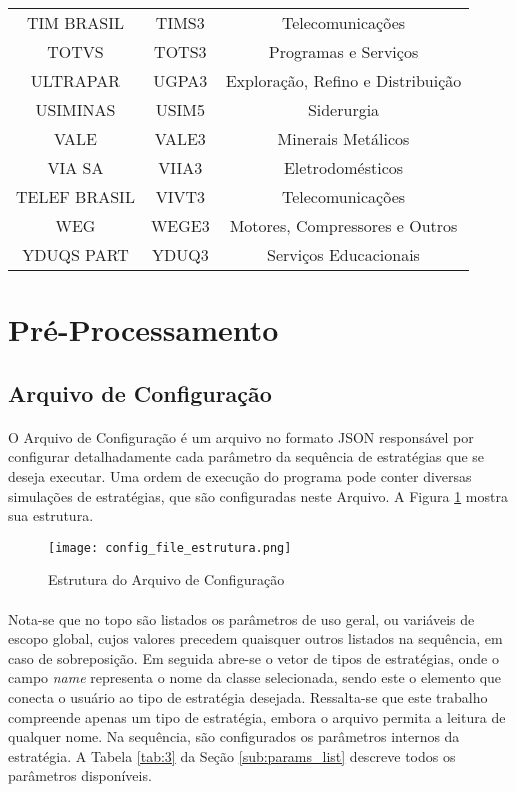 {\begin{longtable}[c]{ccc}
    TIM BRASIL & TIMS3 & Telecomunicações \\
    TOTVS & TOTS3 & Programas e Serviços \\
    ULTRAPAR & UGPA3 & Exploração, Refino e Distribuição \\
    USIMINAS & USIM5 & Siderurgia \\
    VALE & VALE3 & Minerais Metálicos \\
    VIA SA & VIIA3 & Eletrodomésticos \\
    TELEF BRASIL & VIVT3 & Telecomunicações \\
    WEG & WEGE3 & Motores, Compressores e Outros \\
    YDUQS PART & YDUQ3 & Serviços Educacionais \\


\end{longtable}}



\FloatBarrier
\section{Pré-Processamento}

\FloatBarrier
\subsection{Arquivo de Configuração}
\label{sub:conf_file}

\paragraph{} O Arquivo de Configuração é um arquivo no formato JSON responsável por configurar detalhadamente cada parâmetro da sequência de estratégias que se deseja executar. Uma ordem de execução do programa pode conter diversas simulações de estratégias, que são configuradas neste Arquivo. A Figura \ref{fig:101} mostra sua estrutura.

\begin{figure}[!htb]
    \texttt{[image: config\_file\_estrutura.png]}
    \centering
    \caption{Estrutura do Arquivo de Configuração}
    \label{fig:101}
\end{figure}

\paragraph{} Nota-se que no topo são listados os parâmetros de uso geral, ou variáveis de escopo global, cujos valores precedem quaisquer outros listados na sequência, em caso de sobreposição. Em seguida abre-se o vetor de tipos de estratégias, onde o campo \textit{name} representa o nome da classe selecionada, sendo este o elemento que conecta o usuário ao tipo de estratégia desejada. Ressalta-se que este trabalho compreende apenas um tipo de estratégia, embora o arquivo permita a leitura de qualquer nome. Na sequência, são configurados os parâmetros internos da estratégia. A Tabela \ref{tab:3} da Seção \ref{sub:params_list} descreve todos os parâmetros disponíveis.

